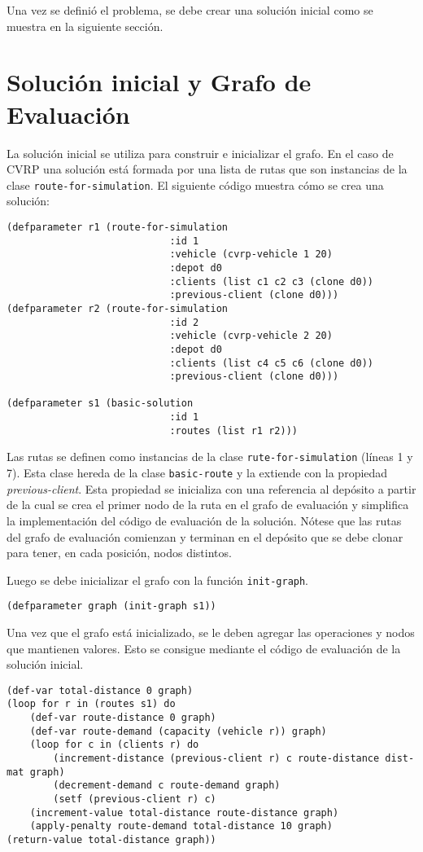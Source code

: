 Una vez se definió el problema, se debe crear una solución inicial como se muestra en la siguiente sección.

\section{Solución inicial y Grafo de Evaluación}\label{4-solution}

La solución inicial se utiliza para construir e inicializar el grafo. En el caso de CVRP una solución está formada por una lista de rutas que son instancias de la clase \texttt{route-for-simulation}. El siguiente código muestra cómo se crea una solución:


\begin{lstlisting}
(defparameter r1 (route-for-simulation 
							:id 1
							:vehicle (cvrp-vehicle 1 20) 
							:depot d0
							:clients (list c1 c2 c3 (clone d0))
							:previous-client (clone d0)))
(defparameter r2 (route-for-simulation 
							:id 2 
							:vehicle (cvrp-vehicle 2 20)
							:depot d0
							:clients (list c4 c5 c6 (clone d0))
							:previous-client (clone d0)))

(defparameter s1 (basic-solution
							:id 1 
							:routes (list r1 r2)))
\end{lstlisting}

Las rutas se definen como instancias de la clase \texttt{rute-for-simulation} (líneas 1 y 7). Esta clase hereda de la clase \texttt{basic-route} y la extiende con la propiedad \textit{previous-client}. Esta propiedad se inicializa con una referencia al depósito a partir de la cual se crea el primer nodo de la ruta en el grafo de evaluación y simplifica la implementación del código de evaluación de la solución. Nótese que las rutas del grafo de evaluación comienzan y terminan en el depósito que se debe clonar para tener, en cada posición, nodos distintos.

Luego se debe inicializar el grafo con la función \texttt{init-graph}.

\begin{lstlisting}
(defparameter graph (init-graph s1))
\end{lstlisting}

Una vez que el grafo está inicializado, se le deben agregar las operaciones y nodos que mantienen valores. Esto se consigue mediante el código de evaluación de la solución inicial.

\begin{lstlisting}
(def-var total-distance 0 graph)
(loop for r in (routes s1) do
	(def-var route-distance 0 graph)
	(def-var route-demand (capacity (vehicle r)) graph) 
	(loop for c in (clients r) do 
		(increment-distance (previous-client r) c route-distance dist-mat graph)
		(decrement-demand c route-demand graph) 
		(setf (previous-client r) c)
	(increment-value total-distance route-distance graph)
	(apply-penalty route-demand total-distance 10 graph)
(return-value total-distance graph))
\end{lstlisting}

